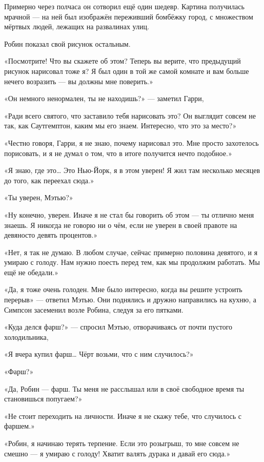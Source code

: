 \documentclass[a5paper, 9pt,
final, openany, twoside=true]{memoir}
\begin{document}
Примерно через полчаса он сотворил ещё один шедевр. Картина получилась мрачной — на ней был изображён переживший бомбёжку город, с множеством мёртвых людей, лежащих на развалинах улиц.\bigskip

Робин показал свой рисунок остальным.

«Посмотрите! Что вы скажете об этом? Теперь вы верите, что предыдущий рисунок нарисовал тоже я? Я был один в той же самой комнате и вам больше нечего возразить — вы должны мне поверить.»

«Он немного ненормален, ты не находишь?» — заметил Гарри,

«Ради всего святого, что заставило тебя нарисовать это? Он выглядит совсем не так, как Саутгемптон, каким мы его знаем. Интересно, что это за место?»

«Честно говоря, Гарри, я не знаю, почему нарисовал это. Мне просто захотелось порисовать, и я не думал о том, что в итоге получится нечто подобное.»

«Я знаю, где это… Это Нью-Йорк, я в этом уверен! Я жил там несколько месяцев до того, как переехал сюда.»

«Ты уверен, Мэтью?»

«Ну конечно, уверен. Иначе я не стал бы говорить об этом — ты отлично меня знаешь. Я никогда не говорю ни о чём, если не уверен в своей правоте на девяносто девять процентов.»

«Нет, я так не думаю. В любом случае, сейчас примерно половина девятого, и я умираю с голоду. Нам нужно поесть перед тем, как мы продолжим работать. Мы ещё не обедали.»

«Да, я тоже очень голоден. Мне было интересно, когда вы решите устроить перерыв» — ответил Мэтью. Они поднялись и дружно направились на кухню, а Симпсон засеменил возле Робина, следуя за его пятками.

«Куда делся фарш?» — спросил Мэтью, отворачиваясь от почти пустого холодильника,

«Я вчера купил фарш… Чёрт возьми, что с ним случилось?»

«Фарш?»

«Да, Робин — фарш. Ты меня не расслышал или в своё свободное время ты становишься попугаем?»

«Не стоит переходить на личности. Иначе я не скажу тебе, что случилось с фаршем.»

«Робин, я начинаю терять терпение. Если это розыгрыш, то мне совсем не смешно — я умираю с голоду! Хватит валять дурака и давай его сюда.»
\end{document}
